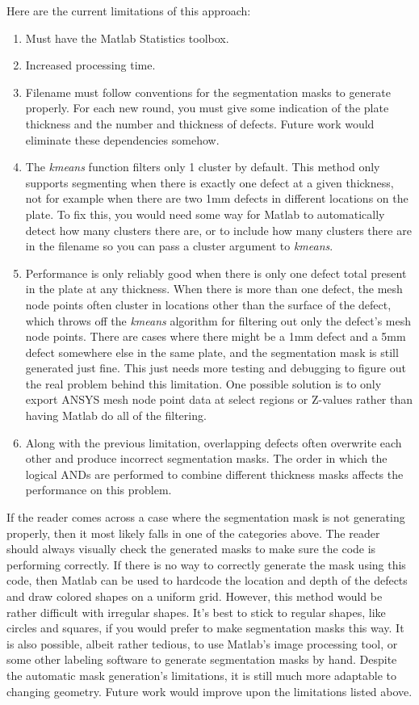\documentclass[11pt,letterpaper]{article}
\begin{document}
			Here are the current limitations of this approach:
			\begin{enumerate}
			\item Must have the Matlab Statistics toolbox.
			\item Increased processing time.
			\item Filename must follow conventions for the segmentation masks to generate properly. For each new round, you must give some indication of the plate thickness and the number and thickness of defects. Future work would eliminate these dependencies somehow.
			\item The \textit{kmeans} function filters only 1 cluster by default. This method only supports segmenting when there is exactly one defect at a given thickness, not for example when there are two 1mm defects in different locations on the plate. To fix this, you would need some way for Matlab to automatically detect how many clusters there are, or to include how many clusters there are in the filename so you can pass a cluster argument to \textit{kmeans}.
			\item Performance is only reliably good when there is only one defect total present in the plate at any thickness. When there is more than one defect, the mesh node points often cluster in locations other than the surface of the defect, which throws off the \textit{kmeans} algorithm for filtering out only the defect's mesh node points. There are cases where there might be a 1mm defect and a 5mm defect somewhere else in the same plate, and the segmentation mask is still generated just fine. This just needs more testing and debugging to figure out the real problem behind this limitation. One possible solution is to only export ANSYS mesh node point data at select regions or Z-values rather than having Matlab do all of the filtering.
			\item Along with the previous limitation, overlapping defects often overwrite each other and produce incorrect segmentation masks. The order in which the logical ANDs are performed to combine different thickness masks affects the performance on this problem.
			\end{enumerate}
			If the reader comes across a case where the segmentation mask is not generating properly, then it most likely falls in one of the categories above. The reader should always visually check the generated masks to make sure the code is performing correctly. If there is no way to correctly generate the mask using this code, then Matlab can be used to hardcode the location and depth of the defects and draw colored shapes on a uniform grid. However, this method would be rather difficult with irregular shapes. It's best to stick to regular shapes, like circles and squares, if you would prefer to make segmentation masks this way. It is also possible, albeit rather tedious, to use Matlab's image processing tool, or some other labeling software to generate segmentation masks by hand. Despite the automatic mask generation's limitations, it is still much more adaptable to changing geometry. Future work would improve upon the limitations listed above.
\end{document}
